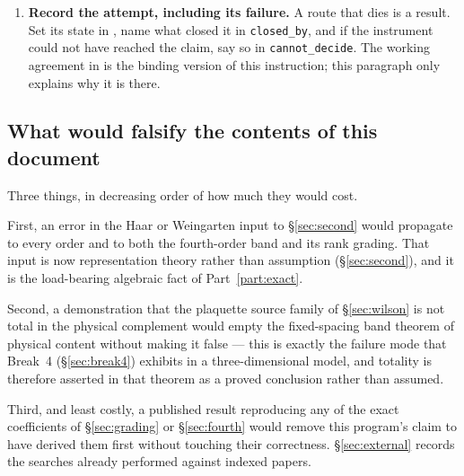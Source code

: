 \begin{enumerate}
  \item \textbf{Record the attempt, including its failure.} A route that
    dies is a result. Set its state in , name
    what closed it in \texttt{closed\_by}, and if the instrument could
    not have reached the claim, say so in \texttt{cannot\_decide}. The
    working agreement in  is the binding version of
    this instruction; this paragraph only explains why it is there.
\end{enumerate}

\subsection{What would falsify the contents of this document}

Three things, in decreasing order of how much they would cost.

First, an error in the Haar or Weingarten input to \S\ref{sec:second}
would propagate to every order and to both the fourth-order band and its
rank grading. That input is now representation theory rather than
assumption (\S\ref{sec:second}), and it is the load-bearing algebraic
fact of Part~\ref{part:exact}.

Second, a demonstration that the plaquette source family of
\S\ref{sec:wilson} is not total in the physical complement would empty
the fixed-spacing band theorem of physical content without making it
false --- this is exactly the failure mode that Break~4
(\S\ref{sec:break4}) exhibits in a three-dimensional model, and totality
is therefore asserted in that theorem as a proved conclusion rather than
assumed.

Third, and least costly, a published result reproducing any of the exact
coefficients of \S\ref{sec:grading} or \S\ref{sec:fourth} would remove
this program's claim to have derived them first without touching their
correctness. \S\ref{sec:external} records the searches already performed
against \LitPapers{} indexed papers.
